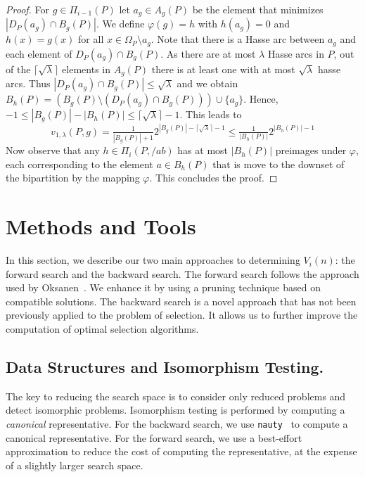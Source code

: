 \documentclass[a4paper,UKenglish,cleveref, autoref, thm-restate]{lipics-v2021}
\newcommand{\less}[2]{D_{#1}(#2)}
\begin{document}
\begin{proof}
  For $g \in \Pi_{i-1}(P)$ let $a_g \in A_g(P)$ be the element that minimizes $|\less{P}{a_g} \cap B_g(P)|$.
  We define $\varphi(g) = h$ with $h(a_g) = 0$ and $h(x) = g(x)$ for all $x \in \Omega_P \setminus a_g$.
  Note that there is a Hasse arc between $a_g$ and each element of $\less{P}{a_g} \cap B_g(P)$.
  As there are at most $\lambda$ Hasse arcs in $P$, out of the $\lceil\sqrt\lambda\rceil$ elements in $A_g(P)$ there is at least one with at most $\sqrt\lambda$ hasse arcs.
  Thus $|\less{P}{a_g} \cap B_g(P)| \le \sqrt\lambda$ and we obtain $B_h(P) = (B_g(P) \setminus (\less{P}{a_g} \cap B_g(P))) \cup \{ a_g \}$.
  Hence, $-1 \le |B_g(P)| - |B_h(P)| \le \lceil\sqrt\lambda\rceil - 1$.
  This leads to
  \begin{equation*}
    v_{1,\lambda}(P, g) = \tfrac{1}{|B_g(P)| + 1}2^{|B_g(P)| - \lceil\sqrt {\lambda} \rceil - 1} \le \tfrac{1}{|B_h(P)|}2^{|B_h(P)| - 1}
  \end{equation*}
  Now observe that any $h \in \Pi_i(P, /ab)$ has at most $|B_h(P)|$ preimages under $\varphi$, each corresponding to the element $a \in B_h(P)$ that is move to the downset of the bipartition by the mapping $\varphi$.
  This concludes the proof.
\end{proof}


\section{Methods and Tools}

In this section, we describe our two main approaches to determining $V_i(n)$: the forward search and the backward search.
The forward search follows the approach used by Oksanen~\cite{Oksanen2006}.
We enhance it by using a pruning technique based on compatible solutions.
The backward search is a novel approach that has not been previously applied to the problem of selection.
It allows us to further improve the computation of optimal selection algorithms.%

\subsection{Data Structures and Isomorphism Testing.}
The key to reducing the search space is to consider only reduced problems and detect isomorphic problems.
Isomorphism testing is performed by computing a \emph{canonical} representative.
For the backward search, we use \texttt{nauty}~\cite{MCKAY201494} to compute a canonical representative.
For the forward search, we use a best-effort approximation to reduce the cost of computing the representative, at the expense of a slightly larger search space.
\end{document}
